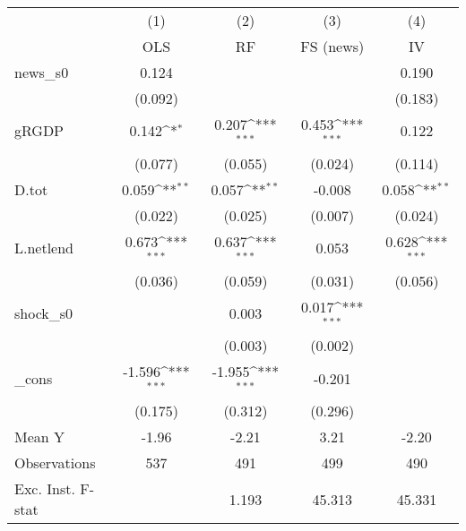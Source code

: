 {
\def\sym#1{\ifmmode^{#1}\else\(^{#1}\)\fi}
\begin{tabular}{l*{4}{c}}
\toprule
            &\multicolumn{1}{c}{(1)}&\multicolumn{1}{c}{(2)}&\multicolumn{1}{c}{(3)}&\multicolumn{1}{c}{(4)}\\
            &\multicolumn{1}{c}{OLS}&\multicolumn{1}{c}{RF}&\multicolumn{1}{c}{FS (news)}&\multicolumn{1}{c}{IV}\\
\midrule
news\_s0     &       0.124         &                     &                     &       0.190         \\
            &     (0.092)         &                     &                     &     (0.183)         \\
\addlinespace
gRGDP       &       0.142\sym{*}  &       0.207\sym{***}&       0.453\sym{***}&       0.122         \\
            &     (0.077)         &     (0.055)         &     (0.024)         &     (0.114)         \\
\addlinespace
D.tot       &       0.059\sym{**} &       0.057\sym{**} &      -0.008         &       0.058\sym{**} \\
            &     (0.022)         &     (0.025)         &     (0.007)         &     (0.024)         \\
\addlinespace
L.netlend   &       0.673\sym{***}&       0.637\sym{***}&       0.053         &       0.628\sym{***}\\
            &     (0.036)         &     (0.059)         &     (0.031)         &     (0.056)         \\
\addlinespace
shock\_s0    &                     &       0.003         &       0.017\sym{***}&                     \\
            &                     &     (0.003)         &     (0.002)         &                     \\
\addlinespace
\_cons      &      -1.596\sym{***}&      -1.955\sym{***}&      -0.201         &                     \\
            &     (0.175)         &     (0.312)         &     (0.296)         &                     \\
\midrule
Mean Y      &       -1.96         &       -2.21         &        3.21         &       -2.20         \\
Observations&         537         &         491         &         499         &         490         \\
Exc. Inst. F-stat&                     &       1.193         &      45.313         &      45.331         \\
\bottomrule
\end{tabular}
}
